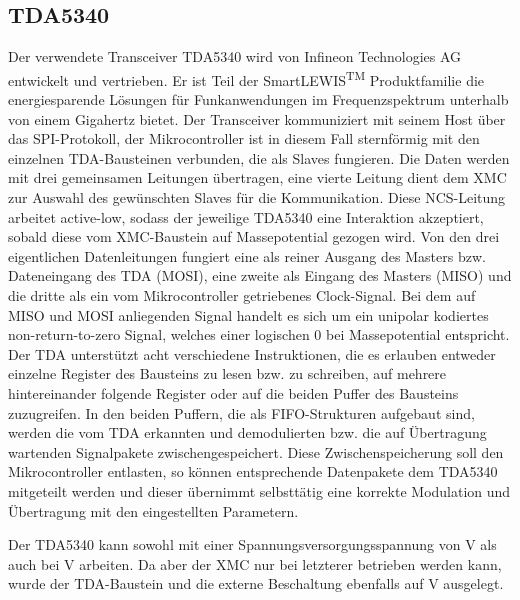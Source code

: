 \subsection{TDA5340}
Der verwendete Transceiver TDA5340 wird von Infineon Technologies AG  entwickelt und vertrieben. Er ist Teil der SmartLEWIS\textsuperscript{TM} Produktfamilie die  energiesparende Lösungen für Funkanwendungen im Frequenzspektrum unterhalb von einem Gigahertz bietet. 
Der Transceiver kommuniziert mit seinem Host über das \ac{SPI}-Protokoll, der Mikrocontroller ist in diesem Fall sternförmig mit den einzelnen TDA-Bausteinen verbunden, die als Slaves fungieren. Die Daten werden mit drei gemeinsamen Leitungen übertragen, eine vierte Leitung dient dem XMC zur Auswahl des gewünschten Slaves für die Kommunikation. Diese \ac{NCS}-Leitung arbeitet active-low, sodass der jeweilige TDA5340 eine Interaktion akzeptiert, sobald diese vom XMC-Baustein auf Massepotential gezogen wird. Von den drei eigentlichen Datenleitungen fungiert eine als reiner Ausgang des Masters bzw. Dateneingang des TDA (\acs{MOSI}), eine zweite als Eingang des Masters (\acs{MISO}) und die dritte als ein vom Mikrocontroller getriebenes Clock-Signal. Bei dem auf \acs{MISO} und \acs{MOSI} anliegenden Signal handelt es sich um ein unipolar kodiertes non-return-to-zero Signal, welches einer logischen $0$ bei Massepotential entspricht. Der TDA unterstützt acht verschiedene Instruktionen, die es erlauben entweder einzelne Register des Bausteins zu lesen bzw. zu schreiben, auf mehrere hintereinander folgende Register  oder auf die beiden Puffer des Bausteins zuzugreifen. In den beiden Puffern, die als \ac{FIFO}-Strukturen  aufgebaut sind, werden die vom TDA erkannten und demodulierten bzw. die auf Übertragung wartenden Signalpakete zwischengespeichert. Diese Zwischenspeicherung soll den Mikrocontroller entlasten, so können entsprechende Datenpakete dem TDA5340 mitgeteilt werden und dieser übernimmt selbsttätig eine korrekte Modulation und Übertragung mit den eingestellten Parametern. 

Der TDA5340 kann sowohl mit einer Spannungsversorgungsspannung von \unit[5]{V} als auch bei \unit[3,3]{V} arbeiten. Da aber der XMC nur bei letzterer betrieben werden kann, wurde der TDA-Baustein und die externe Beschaltung ebenfalls auf  \unit[3,3]{V} ausgelegt. 




